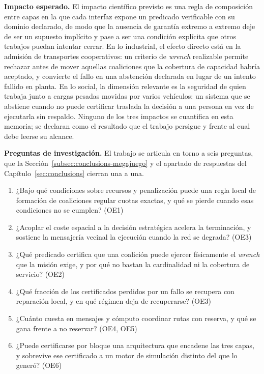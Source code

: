 \par\bigskip
\noindent\textbf{Impacto esperado.}
El impacto científico previsto es una regla de composición entre capas en la que
cada interfaz expone un predicado verificable con su dominio declarado, de modo
que la ausencia de garantía extremo a extremo deje de ser un supuesto implícito
y pase a ser una condición explícita que otros trabajos puedan intentar cerrar.
En lo industrial, el efecto directo está en la admisión de transportes
cooperativos: un criterio de \emph{wrench} realizable permite rechazar antes de
mover aquellas coaliciones que la cobertura de capacidad habría aceptado, y
convierte el fallo en una abstención declarada en lugar de un intento fallido en
planta. En lo social, la dimensión relevante es la seguridad de quien trabaja
junto a cargas pesadas movidas por varios vehículos: un sistema que se abstiene
cuando no puede certificar traslada la decisión a una persona en vez de
ejecutarla sin respaldo. Ninguno de los tres impactos se cuantifica en esta
memoria; se declaran como el resultado que el trabajo persigue y frente al cual
debe leerse su alcance.

\par\medskip
\noindent\textbf{Preguntas de investigación.}
El trabajo se articula en torno a seis preguntas, que la
Sección~\ref{subsec:conclusions-megajuego} y el apartado de respuestas del
Capítulo~\ref{sec:conclusions} cierran una a una.

\begin{enumerate}[label=\textbf{RQ\arabic*.},leftmargin=3.1em,itemsep=0.15em,parsep=0pt]
  \item ¿Bajo qué condiciones sobre recursos y penalización puede una regla
        local de formación de coaliciones regular cuotas exactas, y qué se
        pierde cuando esas condiciones no se cumplen? (OE1)
  \item ¿Acoplar el coste espacial a la decisión estratégica acelera la
        terminación, y sostiene la mensajería vecinal la ejecución cuando la
        red se degrada? (OE3)
  \item ¿Qué predicado certifica que una coalición puede ejercer físicamente el
        \emph{wrench} que la misión exige, y por qué no bastan la cardinalidad
        ni la cobertura de servicio? (OE2)
  \item ¿Qué fracción de los certificados perdidos por un fallo se recupera con
        reparación local, y en qué régimen deja de recuperarse? (OE3)
  \item ¿Cuánto cuesta en mensajes y cómputo coordinar rutas con reserva, y qué
        se gana frente a no reservar? (OE4, OE5)
  \item ¿Puede certificarse por bloque una arquitectura que encadene las tres
        capas, y sobrevive ese certificado a un motor de simulación distinto
        del que lo generó? (OE6)
\end{enumerate}

